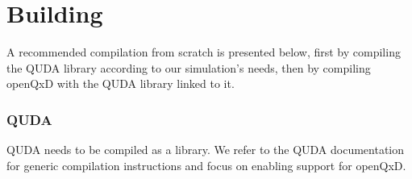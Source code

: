 \chapter{Building}
\label{ch:p1:building}














A recommended compilation from scratch is presented below, first by compiling the QUDA library according to our simulation's needs, then by compiling openQxD with the QUDA library linked to it.

\subsection{QUDA}

QUDA needs to be compiled as a library. We refer to the QUDA documentation \cite{QUDApaper} for generic compilation instructions and focus
on enabling support for openQxD.


